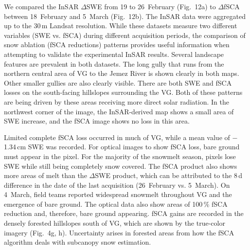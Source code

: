 We compared the InSAR $\Delta$SWE from 19 to 26~February (Fig.~12a) to $\Delta$fSCA between 18~February and 5~March (Fig.~12b). The InSAR data were aggregated up to the 30\,m Landsat resolution. While these datasets measure two different variables (SWE vs. fSCA) during different acquisition periods, the comparison of snow ablation (fSCA reductions) patterns provides useful information when attempting to validate the experimental InSAR results. Several landscape features are prevalent in both datasets. The long gully that runs from the northern central area of VG to the Jemez River is shown clearly in both maps. Other smaller gullies are also clearly visible. There are both SWE and fSCA losses on the south-facing hillslopes surrounding the VG. Both of these patterns are being driven by these areas receiving more direct solar radiation. In the northwest corner of the image, the InSAR-derived map shows a small area of SWE increase, and the fSCA image shows no loss in this area.

Limited complete fSCA loss occurred in much of VG, while a mean value of $-$1.34\,cm SWE was recorded. For optical images to show fSCA loss, bare ground must appear in the pixel. For the majority of the snowmelt season, pixels lose SWE while still being completely snow covered. The fSCA product also shows more areas of melt than the $\Delta$SWE product, which can be attributed to the 8\,d difference in the date of the last acquisition (26~February vs. 5~March). On 4~March, field teams reported widespread snowmelt throughout VG and the emergence of bare ground. The optical data also show areas of 100\,\% fSCA reduction and, therefore, bare ground appearing. fSCA gains are recorded in the densely forested hillslopes south of VG, which are shown by the true-color imagery (Fig.~4g, h). Uncertainty arises in forested areas from how the fSCA algorithm deals with subcanopy snow estimation.

